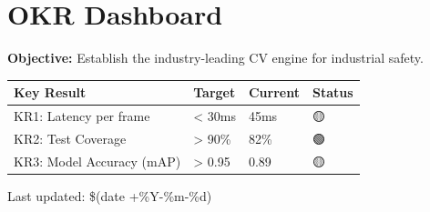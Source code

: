 \documentclass[
]{report}
\author{}
\date{}
\newcounter{none} %
\begin{document}
\newcommand{\theProjectName}{NOAA}
\newcommand{\theAuthor}{Rodrigo Souza dos Santos}

\chapter{OKR Dashboard}\label{okr-dashboard}

\textbf{Objective:} Establish the industry-leading CV engine for
industrial safety.

{\def\LTcaptype{none} %
\begin{longtable}[]{@{}llll@{}}
\toprule\noalign{}
Key Result & Target & Current & Status \\
\midrule\noalign{}
\endhead
\bottomrule\noalign{}
\endlastfoot
KR1: Latency per frame & \textless{} 30ms & 45ms & 🟡 \\
KR2: Test Coverage & \textgreater{} 90\% & 82\% & 🟢 \\
KR3: Model Accuracy (mAP) & \textgreater{} 0.95 & 0.89 & 🟡 \\
\end{longtable}
}

Last updated: \$(date +\%Y-\%m-\%d)
\end{document}
